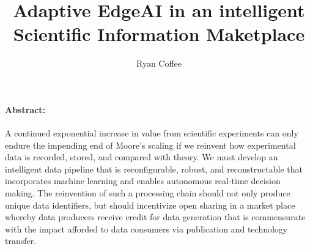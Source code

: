\documentclass{article}
\title{Adaptive EdgeAI in an intelligent Scientific Information Maketplace}
\author{Ryan Coffee}
\begin{document}
\maketitle

\paragraph{Abstract:} %
A continued exponential increase in value from scientific experiments can only endure the impending end of Moore's scaling if we reinvent how experimental data is recorded, stored, and compared with theory.
We must develop an intelligent data pipeline that is reconfigurable, robust, and reconstructable that incorporates machine learning and enables autonomous real-time decision making.
The reinvention of such a processing chain should not only produce unique data identifiers, but should incentivize open sharing in a market place whereby data producers receive credit for data generation that is commensurate with the impact afforded to data consumers via publication and technology transfer.
\end{document}
